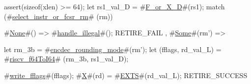 assert(sizeof(xlen) >= 64);
let rs1_val_D = #\hyperref[sailRISCVzFzyorzyXzyD]{F\_or\_X\_D}#(rs1);
match (#\hyperref[sailRISCVzselectzyinstrzyorzyfcsrzyrm]{select\_instr\_or\_fcsr\_rm}# (rm)) {
  #\hyperref[sailRISCVzNone]{None}#() => { #\hyperref[sailRISCVzhandlezyillegal]{handle\_illegal}#(); RETIRE_FAIL },
  #\hyperref[sailRISCVzSome]{Some}#(rm') => {
    let rm_3b = #\hyperref[sailRISCVzencdeczyroundingzymode]{encdec\_rounding\_mode}#(rm');
    let (fflags, rd_val_L) = #\hyperref[sailRISCVzriscvzyf64ToI64]{riscv\_f64ToI64}# (rm_3b, rs1_val_D);

    #\hyperref[sailRISCVzwritezyfflags]{write\_fflags}#(fflags);
    #\hyperref[sailRISCVzX]{X}#(rd) = #\hyperref[sailRISCVzEXTS]{EXTS}#(rd_val_L);
    RETIRE_SUCCESS
  }
}
